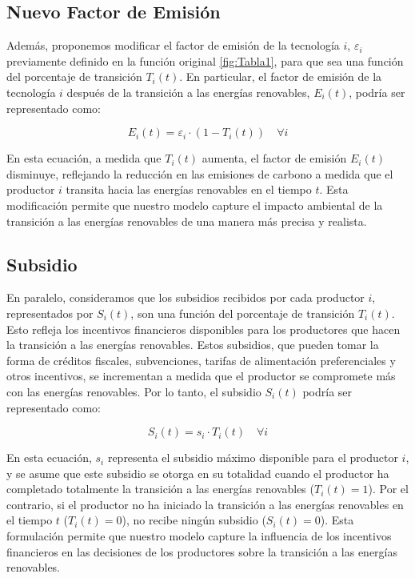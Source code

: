 \subsection{Nuevo Factor de Emisión}\label{c33}

Además, proponemos modificar el factor de emisión de la tecnología \( i \), \( \varepsilon_i \) previamente definido en la función original \ref{fig:Tabla1}, para que sea una función del porcentaje de transición \( T_i(t) \). En particular, el factor de emisión de la tecnología \( i \) después de la transición a las energías renovables, \( E_i(t) \), podría ser representado como:\vspace{2.5mm}

\begin{equation}
E_i(t) = \varepsilon_i \cdot (1 - T_i(t)) \quad \forall i 
 \label{3.3.1}
\end{equation}
\vspace{2.5mm}

En esta ecuación, a medida que \( T_i(t) \) aumenta, el factor de emisión \( E_i(t) \) disminuye, reflejando la reducción en las emisiones de carbono a medida que el productor \( i \) transita hacia las energías renovables en el tiempo \( t \). Esta modificación permite que nuestro modelo capture el impacto ambiental de la transición a las energías renovables de una manera más precisa y realista.\vspace{2.5mm}

\subsection{Subsidio}\label{c34}

En paralelo, consideramos que los subsidios recibidos por cada productor \( i \), representados por \( S_i(t) \), son una función del porcentaje de transición \( T_i(t) \). Esto refleja los incentivos financieros disponibles para los productores que hacen la transición a las energías renovables. Estos subsidios, que pueden tomar la forma de créditos fiscales, subvenciones, tarifas de alimentación preferenciales y otros incentivos, se incrementan a medida que el productor se compromete más con las energías renovables. Por lo tanto, el subsidio \( S_i(t) \) podría ser representado como:

\begin{equation}
S_i(t) = s_i \cdot T_i(t) \quad \forall i 
\label{3.4.1}
\end{equation}


En esta ecuación, \( s_i \) representa el subsidio máximo disponible para el productor \( i \), y se asume que este subsidio se otorga en su totalidad cuando el productor ha completado totalmente la transición a las energías renovables (\( T_i(t) = 1 \)). Por el contrario, si el productor no ha iniciado la transición a las energías renovables en el tiempo \( t \) (\( T_i(t) = 0 \)), no recibe ningún subsidio (\( S_i(t) = 0 \)). Esta formulación permite que nuestro modelo capture la influencia de los incentivos financieros en las decisiones de los productores sobre la transición a las energías renovables.\vspace{2.5mm}

